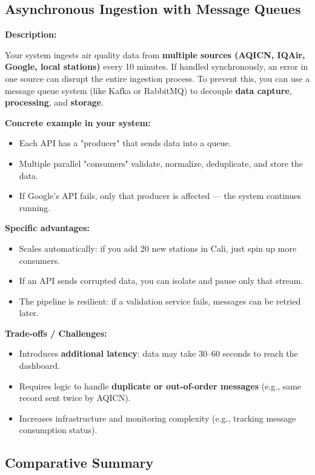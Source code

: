 \subsection{Asynchronous Ingestion with Message Queues}

\textbf{Description:}

Your system ingests air quality data from \textbf{multiple sources (AQICN, IQAir, Google, local stations)} every 10 minutes. If handled synchronously, an error in one source can disrupt the entire ingestion process. To prevent this, you can use a message queue system (like Kafka or RabbitMQ) to decouple \textbf{data capture}, \textbf{processing}, and \textbf{storage}.

\textbf{Concrete example in your system:}
\begin{itemize}
  \item Each API has a "producer" that sends data into a queue.
  \item Multiple parallel "consumers" validate, normalize, deduplicate, and store the data.
  \item If Google's API fails, only that producer is affected — the system continues running.
\end{itemize}

\textbf{Specific advantages:}
\begin{itemize}
  \item Scales automatically: if you add 20 new stations in Cali, just spin up more consumers.
  \item If an API sends corrupted data, you can isolate and pause only that stream.
  \item The pipeline is resilient: if a validation service fails, messages can be retried later.
\end{itemize}

\textbf{Trade-offs / Challenges:}
\begin{itemize}
  \item Introduces \textbf{additional latency}: data may take 30--60 seconds to reach the dashboard.
  \item Requires logic to handle \textbf{duplicate or out-of-order messages} (e.g., same record sent twice by AQICN).
  \item Increases infrastructure and monitoring complexity (e.g., tracking message consumption status).
\end{itemize}

\subsection*{Comparative Summary}

